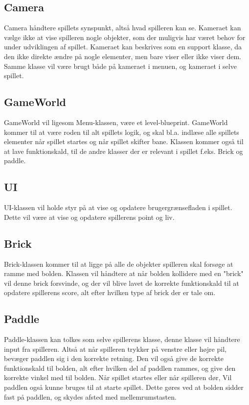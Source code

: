 \subsection{Camera}
Camera håndtere spillets synspunkt, altså hvad spilleren kan se. Kameraet kan vælge ikke at vise spilleren nogle objekter,
som der muligvis har været behov for under udviklingen af spillet. Kameraet kan beskrives som en support klasse, da den ikke
direkte ændre på nogle elementer, men bare viser eller ikke viser dem. Samme klasse vil være brugt både på kameraet i menuen, og
kameraet i selve spillet.

\subsection{GameWorld}
GameWorld vil ligesom Menu-klassen, være et level-blueprint. GameWorld kommer til at være roden til alt spillets logik, og skal
bl.a. indlæse alle spillets elementer når spillet startes og når spillet skifter bane. Klassen kommer også til at lave funktionskald,
til de andre klasser der er relevant i spillet f.eks. Brick og paddle.

\subsection{UI}
UI-klassen vil holde styr på at vise og opdatere brugergrænsefladen i spillet. 
Dette vil være at vise og opdatere spillerens point og liv.

\subsection{Brick}
Brick-klassen kommer til at ligge på alle de objekter spilleren skal forsøge at ramme med bolden. Klassen vil håndtere at når
bolden kollidere med en "brick" vil denne brick forsvinde, og der vil blive lavet de korrekte funktionskald til at opdatere
spillerens score, alt efter hvilken type af brick der er tale om.

\subsection{Paddle}
Paddle-klassen kan tolkes som selve spillerens klasse, denne klasse vil håndtere input fra spilleren. Altså at når spilleren
trykker på venstre eller højre pil, bevæger paddlen sig i den korrekte retning. Den vil også give de korrekte funktionskald
til bolden, alt efter hvilken del af paddlen rammes, og give den korrekte vinkel med til bolden. Når spillet startes eller når spilleren dør,
Vil paddlen også kunne bruges til at starte spillet. Dette gøres ved at bolden sidder fast på paddlen, og skydes afsted med mellemrumstasten.

